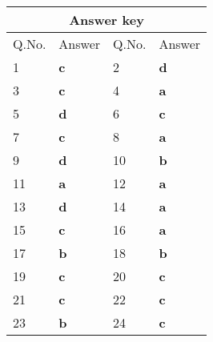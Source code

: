\begin{enumerate}
	\setlength\arrayrulewidth{1pt}
	\begin{table}[H]
		\centering
		\begin{tabular}{|p{1.5cm}|p{1.5cm}||p{1.5cm}|p{1.5cm}|}
			\hline
			\multicolumn{4}{|c|}{\textbf{Answer key}}\\\hline\hline
			\rowcolor{ocrel}Q.No.&Answer&Q.No.&Answer\\\hline
			1&\textbf{c} &2&\textbf{d}\\\hline 
			3&\textbf{c} &4&\textbf{a} \\\hline
			5&\textbf{d} &6&\textbf{c} \\\hline
			7&\textbf{c}&8&\textbf{a}\\\hline
			9&\textbf{d}&10&\textbf{b}\\\hline
			11&\textbf{a} &12&\textbf{a}\\\hline
			13&\textbf{d}&14&\textbf{a}\\\hline
			15&\textbf{c}&16&\textbf{a}\\\hline
			17&\textbf{b}&18&\textbf{b}\\\hline
			19&\textbf{c}&20&\textbf{c}\\\hline
			21&\textbf{c} &22&\textbf{c}\\\hline
			23&\textbf{b}&24&\textbf{c}\\\hline
		\end{tabular}
	\end{table}
	
	
	
	
	
	
	
	
	
	
	
	
	
	
	
	
	
\end{enumerate}




























